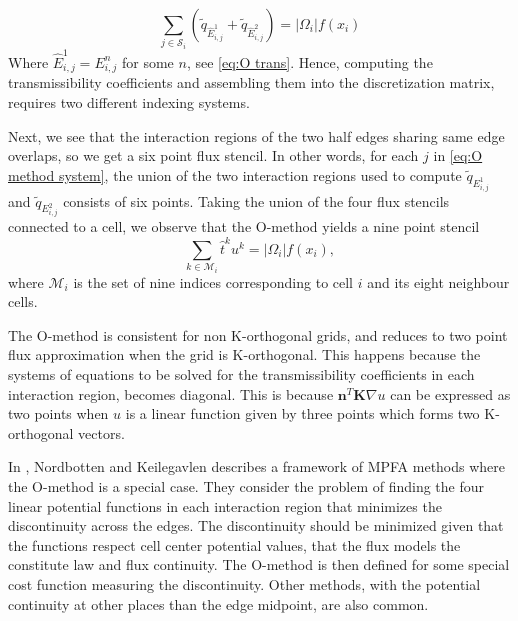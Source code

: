 \documentclass[../Main/main.tex]{subfiles}
\begin{document}
	\begin{equation}\label{eq:O method system}
			\sum_{j\in \mathcal{S}_i} (\tilde{q}_{\hat{E}_{i,j}^1} + \tilde{q}_{\hat{E}_{i,j}^2}) = |\Omega_i|f(x_i) 
	\end{equation}
	Where $\hat{E}_{i,j}^1 = E_{i,j}^n$ for some $n$, see \eqref{eq:O trans}. Hence, computing the transmissibility coefficients and assembling them into the discretization matrix, requires two different indexing systems.\par
	Next, we see that the interaction regions of the two half edges sharing same edge overlaps, so we get a six point flux stencil. In other words, for each $j$ in \eqref{eq:O method system}, the union of the two interaction regions used to compute $\tilde{q}_{E_{i,j}^1}$ and $\tilde{q}_{E_{i,j}^2}$ consists of six points.
	Taking the union of the four flux stencils connected to a cell, we observe that the O-method yields a nine point stencil
	\begin{equation*}
		\sum_{k\in\mathcal{M}_i} \hat{t}^{k}u^k = |\Omega_i|f(x_i),
	\end{equation*}
	where $\mathcal{M}_i$ is the set of nine indices corresponding to cell $i$ and its eight neighbour cells.\par
	The O-method is consistent for non K-orthogonal grids, and reduces to two point flux approximation when the grid is K-orthogonal. This happens because the systems of equations to be solved for the transmissibility coefficients in each interaction region, becomes diagonal. This is because $\bm{n}^T \bm{K} \nabla u$ can be expressed as two points when $u$ is a linear function given by three points which forms two K-orthogonal vectors.
	\par
	In \cite{nordbotten2020introduction}, Nordbotten and Keilegavlen describes a framework of MPFA methods where the O-method is a special case. They consider the problem of finding the four linear potential functions in each interaction region that minimizes the discontinuity across the edges. The discontinuity should be minimized given that the functions respect cell center potential values, that the flux models the constitute law and flux continuity. The O-method is then defined for some special cost function measuring the discontinuity. Other methods, with the potential continuity at other places than the edge midpoint, are also common.
	\par 
\end{document}
